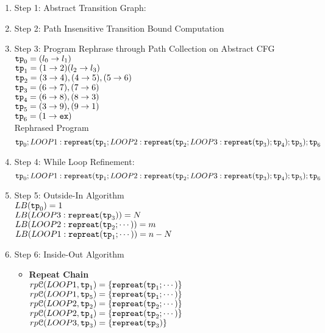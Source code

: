 \begin{enumerate}
    \item Step 1: Abstract Transition Graph:

\item Step 2: Path Insensitive Transition Bound Computation

\item Step 3: Program Rephrase through Path Collection on Abstract CFG
\\
$\mathtt{tp}_0 = (l_0 \to l_1)$
\\
$\mathtt{tp}_1 = (1 \to 2) (l_2 \to l_3)$
\\
$\mathtt{tp}_2 = (3 \to 4), (4 \to 5), (5 \to 6)$
\\
$\mathtt{tp}_3 = (6 \to 7), (7 \to 6)$
\\
$\mathtt{tp}_4 = (6 \to 8), (8 \to 3)$
\\
$\mathtt{tp}_5 = (3 \to 9), (9 \to 1)$
\\
$\mathtt{tp}_6 = (1 \to \mathtt{ex})$
\\
Rephrased Program
\[
\mathtt{tp}_0 ; LOOP1: \mathtt{repreat}(\mathtt{tp}_1; LOOP2: \mathtt{repreat}(\mathtt{tp}_2; LOOP3 : \mathtt{repreat}(\mathtt{tp}_3); \mathtt{tp}_4); \mathtt{tp}_5); \mathtt{tp}_6
\]
\item Step 4: While Loop Refinement:
\[
\mathtt{tp}_0 ; LOOP1: \mathtt{repreat}(\mathtt{tp}_1; LOOP2: \mathtt{repreat}(\mathtt{tp}_2; LOOP3 : \mathtt{repreat}(\mathtt{tp}_3); \mathtt{tp}_4); \mathtt{tp}_5); \mathtt{tp}_6
\]
\item Step 5: Outside-In Algorithm
\\
$LB(\mathtt{tp}_0) = 1$
\\
$LB(LOOP3 : \mathtt{repreat}(\mathtt{tp}_3)) = N $
\\
$LB(LOOP2: \mathtt{repreat}(\mathtt{tp}_2; \cdots)) = m $
\\
$LB(LOOP1: \mathtt{repreat}(\mathtt{tp}_1; \cdots)) = n - N $
\\
\item Step 6: Inside-Out Algorithm
\begin{itemize}
    \item \textbf{Repeat Chain}
    \\
    $rp\mathcal{C}(LOOP1, \mathtt{tp}_1) = \{\mathtt{repreat}(\mathtt{tp}_1; \cdots)\}$ \\
    $rp\mathcal{C}(LOOP1, \mathtt{tp}_5) = \{\mathtt{repreat}(\mathtt{tp}_1; \cdots)\}$ \\
    $rp\mathcal{C}(LOOP2, \mathtt{tp}_2) = \{\mathtt{repreat}(\mathtt{tp}_2; \cdots)\}$ \\
    $rp\mathcal{C}(LOOP2, \mathtt{tp}_4) = \{\mathtt{repreat}(\mathtt{tp}_2; \cdots)\}$ \\
    $rp\mathcal{C}(LOOP3, \mathtt{tp}_3) = \{\mathtt{repreat}(\mathtt{tp}_3)\}$ \\

\end{itemize}
\end{enumerate}
